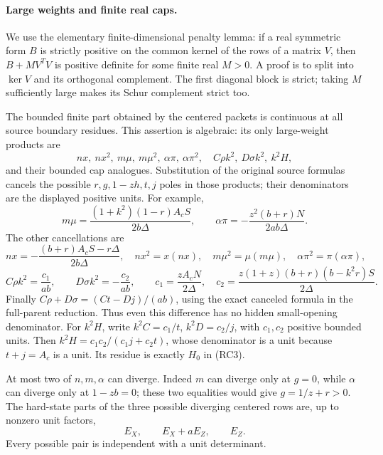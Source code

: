 \paragraph{Large weights and finite real caps.}
We use the elementary finite-dimensional penalty lemma: if a real
symmetric form $B$ is strictly positive on the common kernel of the
rows of a matrix $V$, then $B+M V^TV$ is positive definite for some
finite real $M>0$. A proof is to split into $\ker V$ and its
orthogonal complement. The first diagonal block is strict; taking
$M$ sufficiently large makes its Schur complement strict too.

The bounded finite part obtained by the centered packets is
continuous at all source boundary residues. This assertion is
algebraic: its only large-weight products are
\[
 nx,\ nx^2,\ m\mu,\ m\mu^2,\ \alpha\pi,\ \alpha\pi^2,
 \quad C\rho k^2,\ D\sigma k^2,\ k^2H,
\]
and their bounded cap analogues. Substitution of the original source
formulas cancels the possible $r,g,1-zh,t,j$ poles in those products;
their denominators are the displayed positive units. For example,
\[
 m\mu=\frac{(1+k^2)(1-r)A_cS}{2b\Delta},\qquad
 \alpha\pi=-\frac{z^2(b+r)N}{2ab\Delta}.
\]
The other cancellations are
\[
 nx=-\frac{(b+r)A_cS-r\Delta}{2b\Delta},\quad
 nx^2=x(nx),\quad m\mu^2=\mu(m\mu),\quad
 \alpha\pi^2=\pi(\alpha\pi),
\]
\[
 C\rho k^2=\frac{c_1}{ab},\qquad
 D\sigma k^2=-\frac{c_2}{ab},\qquad
 c_1=\frac{zA_cN}{2\Delta},\quad
 c_2=\frac{z(1+z)(b+r)(b-k^2r)S}{2\Delta}.
\]
Finally $C\rho+D\sigma=(Ct-Dj)/(ab)$, using the exact canceled
formula in the full-parent reduction. Thus even this difference has
no hidden small-opening denominator.
For $k^2H$, write $k^2C=c_1/t$, $k^2D=c_2/j$, with
$c_1,c_2$ positive bounded units. Then
$k^2H=c_1c_2/(c_1j+c_2t)$, whose denominator is a unit because
$t+j=A_c$ is a unit. Its residue is exactly $H_0$ in (RC3).

At most two of $n,m,\alpha$ can diverge. Indeed $m$ can diverge
only at $g=0$, while $\alpha$ can diverge only at $1-zb=0$;
these two equalities would give $g=1/z+r>0$. The hard-state parts
of the three possible diverging centered rows are, up to nonzero
unit factors,
\[
                   E_X,\qquad E_X+aE_Z,\qquad E_Z.
\]
Every possible pair is independent with a unit determinant.

